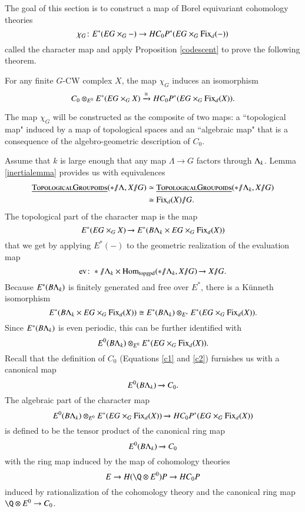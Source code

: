 
The goal of this section is to construct a map of Borel equivariant cohomology theories 
\[
\chi_G \colon E^*(EG \times_G -) \rightarrow HC_{0}P^{*}(EG \times_G \operatorname{Fix}_d(-))
\]
called the character map and apply Proposition \ref{codescent} to prove the following theorem.

\begin{theorem} \label{mainthm1}
For any finite $G$-CW complex $X$, the map $\chi_G$ induces an isomorphism
\[
C_0 \otimes_{E^0} E^*(EG \times_G X) \xrightarrow{\cong} HC_{0}P^{*}(EG \times_G \operatorname{Fix}_d(X)).
\]
\end{theorem}

The map $\chi_G$ will be constructed as the composite of two maps: a ``topological map" induced by a map of topological spaces and an ``algebraic map" that is a consequence of the algebro-geometric description of $C_0$.

Assume that $k$ is large enough that any map $\Lambda \rightarrow G$ factors through $\Lambda_k$. Lemma \ref{inertialemma} provides us with equivalences
\begin{align*}
\InternalHom{TopologicalGroupoids}(* \mmod \Lambda, X \mmod G) & \simeq \InternalHom{TopologicalGroupoids}(* \mmod \Lk, X \mmod G) \\
& \simeq \Fix_d(X)\mmod G.
\end{align*}
The topological part of the character map is the map
\[
E^*(EG \times_G X) \xrightarrow{} E^*(B\Lambda_k \times EG\times_G \operatorname{Fix}_d(X))
\]
that we get by applying $E^*(-)$ to the geometric realization of the evaluation map
\[
\mathrm{ev} \colon * \mmod \Lk \times \text{Hom}_{\mathrm{topgpd}}(* \mmod \Lk, X \mmod G) \xrightarrow{} X \mmod G.
\]
Because $E^*(B\Lambda_k)$ is finitely generated and free over $E^*$, there is a K\"unneth isomorphism
\[
E^*(B\Lambda_k \times EG\times_G \operatorname{Fix}_d(X)) \cong E^*(B\Lambda_k) \otimes_{E^*} E^*(EG \times_G \operatorname{Fix}_d(X)).
\]
Since $E^*(B\Lambda_k)$ is even periodic, this can be further identified with
\[
E^0(B\Lambda_k) \otimes_{E^0} E^*(EG \times_G \operatorname{Fix}_d(X)).
\]
Recall that the definition of $C_0$ (Equations \ref{c1} and \ref{c2}) furnishes us with a canonical map
\[
E^0(B\Lambda_k) \xrightarrow{} C_0.
\]
The algebraic part of the character map
\[
E^0(B\Lambda_k) \otimes_{E^0} E^*(EG \times_G \operatorname{Fix}_d(X)) \xrightarrow{} HC_{0}P^{*}(EG \times_G \operatorname{Fix}_d(X)) 
\]
is defined to be the tensor product of the canonical ring map
\[
E^0(B\Lambda_k) \xrightarrow{} C_0
\]
with the ring map induced by the map of cohomology theories
\[
E \rightarrow H(\Q \otimes E^0)P \rightarrow HC_0P
\]
induced by rationalization of the cohomology theory and the canonical ring map $\Q \otimes E^0 \rightarrow C_0$.

